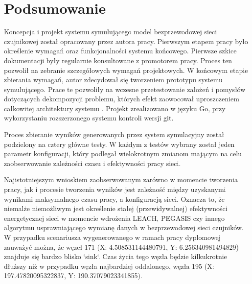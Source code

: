 \documentclass[a4paper,12pt,twoside,openany]{report}
\begin{document}
\chapter{Podsumowanie}
\par
Koncepcja i projekt systemu symulującego model bezprzewodowej sieci czujnikowej został opracowany przez autora pracy.
Pierwszym etapem pracy było określenie wymagań oraz funkcjonalności systemu końcowego. Pierwsze szkice dokumentacji były regularnie konsultowane z promotorem pracy.
Proces ten pozwolił na zebranie szczegółowych wymagań projektowych. W końcowym etapie zbierania wymagań, autor zdecydował się tworzeniem prototypu systemu symulującego.
Prace te pozwoliły na wczesne przetestowanie założeń i pomysłów dotyczących dekompozycji problemu, których efekt zaowocował uproszczeniem całkowitej architektury systemu \cite{SoftwareDesingBook}.
Projekt zrealizowano w języku Go, przy wykorzystaniu rozszerzonego systemu kontroli wersji git.
\par
Proces zbieranie wyników generowanych przez system symulacyjny został podzielony na cztery główne testy.
W każdym z testów wybrany został jeden parametr konfiguracji, który podlegał wielokrotnym zmianom mającym na celu zaobserwowanie zależności czasu i efektywności pracy sieci.
\par
Najistotniejszym wnioskiem zaobserwowanym zarówno w momencie tworzenia pracy, jak i procesie tworzenia wyników jest zależność między uzyskanymi wynikami maksymalnego czasu pracy, a konfiguracją sieci.
Oznacza to, że niemalże niemożliwym jest określenie stałej (przewidywalnej) efektywności energetycznej sieci w momencie wdrożenia LEACH, PEGASIS czy innego algorytmu usprawniającego
wymianę danych w bezprzewodowej sieci czujników. W przypadku scenariusza wygenerowanego w ramach pracy dyplomowej zauważyć można, że węzeł 171 (X: 4.508531144480791, Y: 6.256340981494829) 
znajduje się bardzo blisko `sink`. Czas życia tego węzła będzie kilkukrotnie dłuższy niż w przypadku węzła najbardziej oddalonego, węzła 195 (X: 197.47820095322837, Y: 190.37079023341855).
\end{document}
